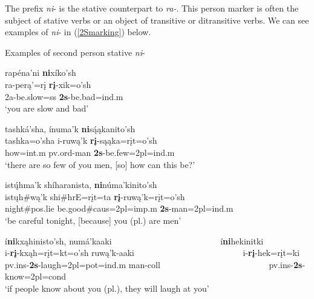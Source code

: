 \label{Para2S}

The prefix \textit{ni}- is the stative counterpart to \textit{ra-}. This person marker is often the subject of stative verbs or an object of transitive or ditransitive verbs. We can see examples of \textit{ni}- in (\ref{2Smarking}) below.



\begin{exe}

\item\label{2Smarking} Examples of second person stative \textit{ni}-

	\begin{xlist}
	
	\item \glll rapéna'ni \textbf{ni}xíko'sh\\
	ra-perą'=rį \textbf{rį}-xik=o'sh\\
	2a-\textnormal{be.slow}=ss \textbf{2s}-\textnormal{be.bad}=ind.m\\
	\glt `you are slow and bad' \citep[163]{hollow1973b}
	
	\item \glll tashká'sha, ínuma'k \textbf{ni}są́ąkanito'sh\\
	tashka=o'sha i-ruwą'k \textbf{rį}-sąąka=rįt=o'sh\\
	\textnormal{how}=int.m pv.ord-\textnormal{man} \textbf{2s}-\textnormal{be.few}=2pl=ind.m\\
	\glt `there are so few of you men, [so] how can this be?' \citep[151]{hollow1973b}
	
	\item \glll istų́hma'k shíharanista, \textbf{ni}núma'kinito'sh\\
	istųh\#wą'k shi\#hrE=rįt=ta \textbf{rį}-ruwą'k=rįt=o'sh\\
	\textnormal{night}\#pos.lie \textnormal{be.good}\#caus=2pl=imp.m \textbf{2s}-\textnormal{man}=2pl=ind.m\\
	\glt `be careful tonight, [because] you (pl.) are men' \citep[258]{hollow1973b}
	
	\item \glll í\textbf{ni}kxąhinisto'sh, numá'kaaki ~ ~ ~ ~ ~ ~ ~ ~ ~ ~ ~ ~ ~ ~ ~ í\textbf{ni}hekinitki\\
	i-\textbf{rį}-kxąh=rįt=kt=o'sh ruwą'k-aaki ~ ~ ~ ~ ~  ~ ~ ~ ~ ~ ~ ~ ~ ~ ~ i-\textbf{rį}-hek=rįt=ki\\
	pv.ins-\textbf{2s}-\textnormal{laugh}=2pl=pot=ind.m \textnormal{man}-coll ~ ~ ~ ~ ~ ~ ~ ~ ~ ~ ~ ~ ~ ~ ~ pv.ins-\textbf{2s}-\textnormal{know}=2pl=cond\\
	\glt `if people know about you (pl.), they will laugh at you' \citep[28]{hollow1973a}
	

\end{xlist}
\end{exe}
